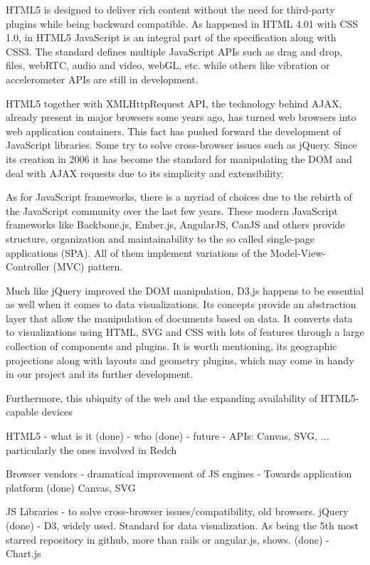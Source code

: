 HTML5 is designed to deliver rich content without the need for third-party plugins while being backward compatible. As happened in HTML 4.01 with CSS 1.0, in HTML5 JavaScript is an integral part of the specification along with CSS3. The standard defines multiple JavaScript APIs such as drag and drop, files, webRTC, audio and video, webGL, etc. while others like vibration or accelerometer APIs are still in development.

HTML5 together with XMLHttpRequest API, the technology behind AJAX, already present in major browsers some years ago, has turned web browsers into web application containers. This fact has pushed forward the development of JavaScript libraries. Some try to solve cross-browser issues such as jQuery. Since its creation in 2006 it has become the standard for manipulating the DOM and deal with AJAX requests due to its simplicity and extensibility.

As for JavaScript frameworks, there is a myriad of choices due to the rebirth of the JavaScript community over the last few years. These modern JavaScript frameworks like Backbone.js, Ember.js, AngularJS, CanJS and others provide structure, organization and maintainability to the so called single-page applications (SPA). All of them implement variations of the Model-View-Controller (MVC) pattern.

Much like jQuery improved the DOM manipulation, D3.js happens to be essential as well when it comes to data visualizations. Its concepts provide an abstraction layer that allow the manipulation of documents based on data. It converts data to visualizations using HTML, SVG and CSS with lots of features through a large collection of components and plugins. It is worth mentioning, its geographic projections along with layouts and geometry plugins, which may come in handy in our project and its further development.

Furthermore, this ubiquity of the web and the expanding availability of HTML5-capable devices 

HTML5	
	- what is it (done)
	- who (done)
	- future
	- APIs: Canvas, SVG, ... particularly the ones involved in Redch

Browser vendors
	- dramatical improvement of JS engines
	- Towards application platform (done)
Canvas, SVG

JS Libraries
	- to solve cross-browser issues/compatibility, old browsers. jQuery (done)
	- D3, widely used. Standard for data visualization. As being the 5th most starred repository in github, more than rails or angular.js, shows. (done)
	- Chart.js

